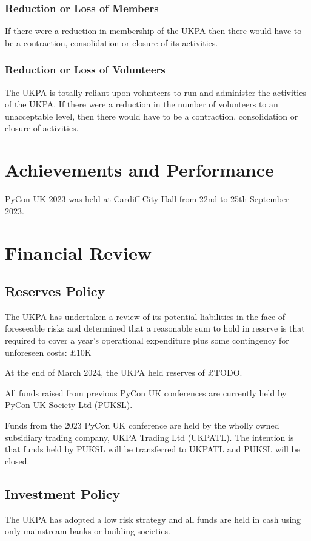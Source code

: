 \documentclass[11pt, final]{article}
\begin{document}
\subsubsection{Reduction or Loss of Members}
If there were a reduction in membership of the UKPA then there would have to be a contraction, consolidation or closure of its activities.


\subsubsection{Reduction or Loss of Volunteers}
The UKPA is totally reliant upon volunteers to run and administer the activities of the UKPA. If there were a reduction in the number of volunteers to an unacceptable level, then there would have to be a contraction, consolidation or closure of activities.

\section{Achievements and Performance}
PyCon UK 2023 was held at Cardiff City Hall from 22nd to 25th September 2023.

\section{Financial Review}

\subsection{Reserves Policy}
The UKPA has undertaken a review of its potential liabilities in the face of foreseeable risks and determined that a reasonable sum to hold in reserve is that required to cover a year's operational expenditure plus some contingency for unforeseen costs: \pounds10K

At the end of March 2024, the UKPA held reserves of \pounds TODO.

All funds raised from previous PyCon UK conferences are currently held by PyCon UK Society Ltd (PUKSL). 

Funds from the 2023 PyCon UK conference are held by the wholly owned subsidiary trading company, UKPA Trading Ltd (UKPATL). The intention is that funds held by PUKSL will be transferred to UKPATL and PUKSL will be closed.

\subsection{Investment Policy}
The UKPA has adopted a low risk strategy and all funds are held in cash using only mainstream banks or building societies.
\end{document}
